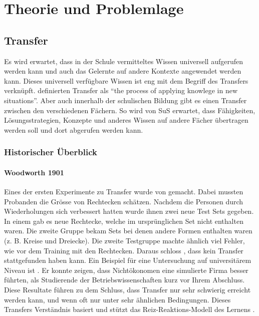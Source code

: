 \chapter{Theorie und Problemlage}

\section{Transfer}

Es wird erwartet, dass in der Schule vermitteltes Wissen universell aufgerufen werden kann und auch das Gelernte auf andere Kontexte angewendet werden kann. Dieses universell verfügbare Wissen ist eng mit dem Begriff des Transfers verknüpft. \citet{Greeno1996} definierten Transfer als "`the process of applying knowlege in new situations"'. Aber auch innerhalb der schulischen Bildung gibt es einen Transfer zwischen den verschiedenen Fächern. So wird von SuS erwartet, dass Fähigkeiten, Lösungsstrategien, Konzepte und anderes Wissen auf andere Fächer übertragen werden soll und dort abgerufen werden kann.

\subsection{Historischer Überblick}


\subsubsection{Woodworth 1901}

Eines der ersten Experimente zu Transfer wurde von \citet{Woodworth1901} gemacht. Dabei mussten Probanden die Grösse von Rechtecken schätzen. Nachdem die Personen durch Wiederholungen sich verbessert hatten wurde ihnen zwei neue Test Sets gegeben. In einem gab es neue Rechtecke, welche im ursprünglichen Set nicht enthalten waren. Die zweite Gruppe bekam Sets bei denen andere Formen enthalten waren (z. B. Kreise und Dreiecke). Die zweite Testgruppe machte ähnlich viel Fehler, wie vor dem Training mit den Rechtecken. Daraus schloss \citeauthor{Woodworth1901}, dass kein Transfer stattgefunden haben kann.
Ein Beispiel für eine Untersuchung auf universitärem Niveau ist \citet{Renkl1994}. Er konnte zeigen, dass Nichtökonomen eine simulierte Firma besser führten, als Studierende der Betriebswissenschaften kurz vor Ihrem Abschluss. Diese Resultate führen zu dem Schluss, dass Transfer nur sehr schwierig erreicht werden kann, und wenn oft nur unter sehr ähnlichen Bedingungen.
Dieses Transfers Verständnis basiert und stützt das Reiz-Reaktions-Modell des Lernens \citep{Detterman1993, Mietzel2007}.
